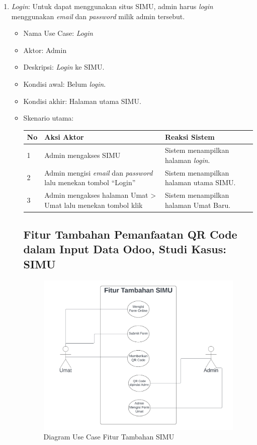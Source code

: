 \begin{enumerate}
	\item \textit{Login}: Untuk dapat menggunakan situs SIMU, admin harus \textit{login} menggunakan \textit{email} dan \textit{password} milik admin tersebut.
	\begin{itemize}
		\item Nama Use Case: \textit{Login}
		\item Aktor: Admin
		\item Deskripsi: \textit{Login} ke SIMU.
		\item Kondisi awal: Belum \textit{login}.
		\item Kondisi akhir: Halaman utama SIMU.
		\item Skenario utama:
		\begin{table}[h!]
			\centering
			\label{}
			\begin{tabular}{ | m{0.5cm} | m{7cm}| m{6cm} | } 
				\hline
				No & Aksi Aktor & Reaksi Sistem \\ 
				\hline
				1 & Admin mengakses SIMU & Sistem menampilkan halaman \textit{login}.
				\\ 
				\hline
				2 & Admin mengisi \textit{email} dan \textit{password} lalu menekan tombol ``Login'' & Sistem menampilkan halaman utama SIMU.
				\\ 
				\hline
				3 & Admin mengakses halaman Umat > Umat lalu menekan tombol klik & Sistem menampilkan halaman Umat Baru.
				\\ 
				\hline
			\end{tabular}
		\end{table}

\newpage

\subsection{Fitur Tambahan Pemanfaatan QR Code dalam Input Data Odoo, Studi Kasus: SIMU}

\begin{figure}[H]
	\centering
	\includegraphics[scale=0.7]{Gambar/fiturTambahan.png}
	\caption{Diagram Use Case Fitur Tambahan SIMU} 
	\label{fig:fiturTambahan}
\end{figure}


\end{itemize}
\end{enumerate}
